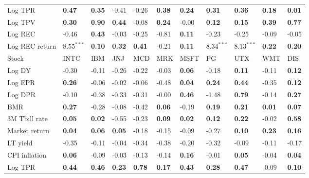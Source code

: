 \begin{table}[h!]
{\begin{center}
\begin{tabularx}{1\textwidth}{@{}X@{\hspace{0.2cm}}l@{\hspace{0.2cm}}l@{\hspace{0.2cm}}l@{\hspace{0.2cm}}l@{\hspace{0.2cm}}l@{\hspace{0.2cm}}l@{\hspace{0.2cm}}l@{\hspace{0.2cm}}l@{\hspace{0.2cm}}l@{\hspace{0.2cm}}l@{}}
\midrule
 Log TPR  & \textbf{0.47}	 & \textbf{0.35}	 & -0.41	 & -0.26	 & \textbf{0.38}	 & \textbf{0.24}	 & \textbf{0.31}	 & \textbf{0.36}	 & \textbf{0.18}	 & \textbf{0.01}	\\
 Log TPV  & \textbf{0.30}	 & \textbf{0.90}	 & \textbf{0.44}	 & -0.08	 & \textbf{0.24}	 & -0.00	 & \textbf{0.12}	 & \textbf{0.15}	 & \textbf{0.39}	 & \textbf{0.77}	\\
 Log REC  & -0.46	 & \textbf{0.43}	 & -0.03	 & -0.25	 & -0.81	 & \textbf{0.11}	 & -0.23	 & -0.25	 & -0.09	 & -0.05	\\
 Log REC return  & $\mathbf{8.55^{***}}$	 & \textbf{0.10}	 & \textbf{0.32}	 & \textbf{0.41}	 & -0.21	 & \textbf{0.11}	 & $\mathbf{8.34^{***}}$	 & $\mathbf{8.13^{***}}$	 & \textbf{0.22}	 & \textbf{0.20}	\\
\midrule
\midrule
 Stock  & INTC	 & IBM	 & JNJ	 & MCD	 & MRK	 & MSFT	 & PG	 & UTX	 & WMT	 & DIS	\\
\midrule
 Log DY  & -0.30	 & -0.11	 & -0.26	 & -0.22	 & -0.03	 & \textbf{0.06}	 & -0.18	 & \textbf{0.11}	 & -0.11	 & \textbf{0.12}	\\
 Log EPR  & \textbf{0.26}	 & -0.06	 & -0.02	 & -0.06	 & -0.48	 & \textbf{0.04}	 & \textbf{0.24}	 & \textbf{0.44}	 & -0.35	 & \textbf{0.12}	\\
 Log DPR  & -0.10	 & -0.38	 & -0.33	 & -0.31	 & -0.00	 & \textbf{0.46}	 & -1.48	 & \textbf{0.79}	 & -0.14	 & \textbf{0.27}	\\
 BMR  & \textbf{0.27}	 & -0.28	 & -0.08	 & -0.42	 & \textbf{0.06}	 & -0.19	 & \textbf{0.19}	 & \textbf{0.21}	 & \textbf{0.01}	 & \textbf{0.07}	\\
\midrule
 3M Tbill rate  & \textbf{0.05}	 & \textbf{0.02}	 & -0.55	 & -0.23	 & \textbf{0.09}	 & \textbf{0.02}	 & \textbf{0.12}	 & \textbf{0.22}	 & -0.02	 & \textbf{0.58}	\\
 Market return  & \textbf{0.04}	 & \textbf{0.06}	 & \textbf{0.05}	 & -0.18	 & -0.15	 & -0.09	 & -0.27	 & \textbf{0.10}	 & \textbf{0.23}	 & \textbf{0.16}	\\
 LT yield  & -0.35	 & -0.11	 & -0.04	 & -0.34	 & -0.38	 & -0.20	 & -0.32	 & -0.09	 & -0.11	 & -0.17	\\
 CPI inflation  & \textbf{0.06}	 & -0.09	 & -0.03	 & -0.13	 & -0.14	 & \textbf{0.16}	 & -0.01	 & \textbf{0.05}	 & -0.04	 & \textbf{0.04}	\\
\midrule
 Log TPR  & \textbf{0.44}	 & \textbf{0.46}	 & \textbf{0.23}	 & \textbf{0.78}	 & \textbf{0.17}	 & \textbf{0.43}	 & \textbf{0.28}	 & \textbf{0.47}	 & -0.09	 & \textbf{0.10}	\\

\end{tabularx}
\end{center}}
\end{table}

